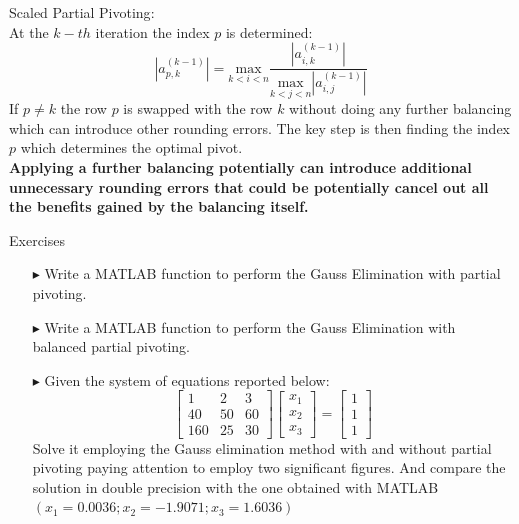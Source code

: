 \documentclass[xcolor={dvipsnames,rgb}, aspectratio=169]{beamer}
\begin{document}
\begin{frame}{}
   \alert{Scaled Partial Pivoting}:\\
   At the $k-th$ iteration the index $p$ is determined:
   \begin{equation*}
      |a_{p,k}^{(k-1)}| =
      \underset{k<i<n}{\mathrm{max}}\frac{|a_{i,k}^{(k-1)}|}{\underset{k<j<n}{\mathrm{max}}|a_{i,j}^{(k-1)}|}
   \end{equation*}
   If $p \neq k$ the row $p$ is swapped with the row $k$ without doing any further
   balancing which can introduce other rounding errors. The key step is then finding the
   index $p$ which determines the optimal pivot.\\ \textbf{Applying a further balancing
   potentially can introduce additional unnecessary rounding errors that could be
   potentially cancel out all the benefits gained by the balancing itself.}
\end{frame}

{%
   \begin{frame}[standout]
	   Exercises
   \end{frame}
}
\begin{frame}{}
   \begin{itemize}
      \item[$\blacktriangleright$] Write a MATLAB function to perform the Gauss
         Elimination with partial pivoting.
      \item[$\blacktriangleright$] Write a MATLAB function to perform the Gauss
         Elimination with balanced partial pivoting.
      \item[$\blacktriangleright$] Given the system of equations reported below:
         \begin{equation*}
            \begin{bmatrix}
               1   & 2  & 3 \\
               40  & 50 & 60 \\
               160 & 25 & 30
            \end{bmatrix}
            \begin{bmatrix}
               x_{1} \\ x_{2} \\ x_{3}
            \end{bmatrix} =
            \begin{bmatrix}
               1 \\ 1 \\ 1
            \end{bmatrix}
         \end{equation*}
         Solve it employing the Gauss elimination method with and without partial
         pivoting paying attention to employ two significant figures. And compare the
         solution in double precision with the one obtained with MATLAB
         $\left(x_{1}=0.0036; x_{2}=-1.9071;x_{3}=1.6036\right)$
   \end{itemize}
\end{frame}
\end{document}
